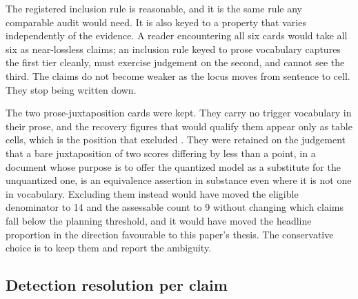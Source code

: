 The registered inclusion rule is reasonable, and it is the same rule any
comparable audit would need. It is also keyed to a property that varies
independently of the evidence. A reader encountering all six cards would take
all six as near-lossless claims; an inclusion rule keyed to prose vocabulary
captures the first tier cleanly, must exercise judgement on the second, and
cannot see the third. The claims do not become weaker as the locus moves from
sentence to cell. They stop being written down.

The two prose-juxtaposition cards were kept. They carry no trigger vocabulary in
their prose, and the recovery figures that would qualify them appear only as
table cells, which is the position that excluded \AuditIneligibleClaim{}. They
were retained on the judgement that a bare juxtaposition of two scores differing
by less than a point, in a document whose purpose is to offer the quantized
model as a substitute for the unquantized one, is an equivalence assertion in
substance even where it is not one in vocabulary. Excluding them instead would
have moved the eligible denominator to 14 and the assessable count to 9 without
changing which claims fall below the planning threshold, and it would have moved
the headline proportion in the direction favourable to this paper's thesis. The
conservative choice is to keep them and report the ambiguity.

\subsection{Detection resolution per claim}
\label{app:audit:mdd}

